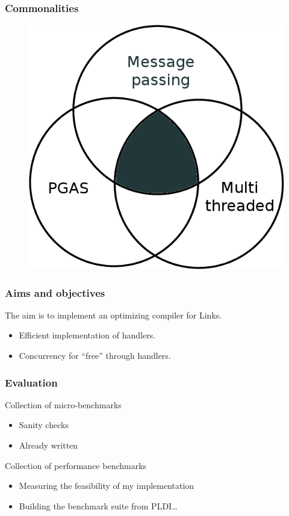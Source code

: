 \documentclass[10pt,compress]{beamer}
\begin{document}
  \begin{frame}
    \frametitle{Commonalities}
    \begin{center}
      \begin{figure}
        \includegraphics[scale=0.3]{venn.png}
      \end{figure}
    \end{center}
  \end{frame}

  \begin{frame}
    \frametitle{Aims and objectives}
    The aim is to implement an optimizing compiler for Links.
    \begin{itemize}
       \item Efficient implementation of handlers.
       \item Concurrency for ``free'' through handlers.
    \end{itemize}
  \end{frame}

  \begin{frame}
    \frametitle{Evaluation}
    Collection of micro-benchmarks
    \begin{itemize}
      \item Sanity checks
      \item Already written
    \end{itemize}
    Collection of performance benchmarks
    \begin{itemize}
      \item Measuring the feasibility of my implementation
      \item Building the benchmark suite from PLDI\dots
    \end{itemize}
  \end{frame}
\end{document}
